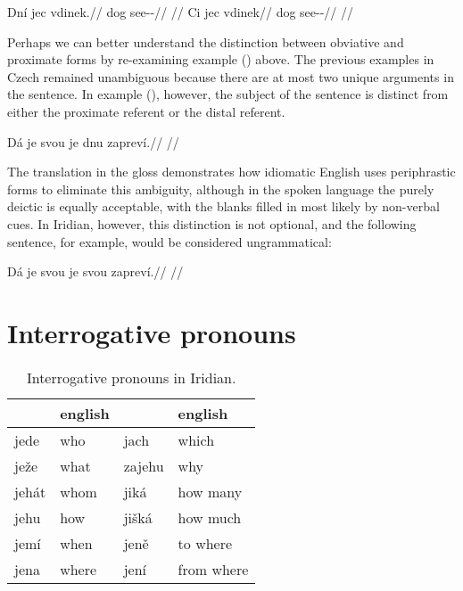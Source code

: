 \pex
\a
\begingl
\gla Dní jec vdinek.//
\glb {} dog see-\Pv{}-\Pf{}//
\glft {}//
\endgl
\a \begingl
\gla Ci jec vdinek//
\glb {} dog see-\Pv{}-\Pf{}//
\glft {}//
\endgl
\xe

Perhaps we can better understand the distinction between obviative and proximate forms by re-examining example () above. The previous examples in Czech remained unambiguous because there are at most two unique arguments in the sentence. In example (), however, the subject of the sentence is distinct from either the proximate referent or the distal referent.

\ex[exno={\getfullref{obv.obv1}}]
\begingl
\gla Dá je svou je dnu zapreví.//
\glft {}//
\endgl
\xe

The translation in the gloss demonstrates how idiomatic English uses periphrastic forms to eliminate this ambiguity, although in the spoken language the purely deictic  is equally acceptable, with the blanks filled in most likely by non-verbal cues. In Iridian, however, this distinction is not optional, and the following sentence, for example, would be considered ungrammatical:

\ex
\begingl
\gla *Dá je svou je svou zapreví.//
\glft {}//
\endgl
\xe

\section{Interrogative pronouns}\label{sec:int-pron}

\begin{table}[h!]
	\sffamily\footnotesize
	\caption{Interrogative pronouns in Iridian.}
    \medskip
	\begin{tabu} to 0.8
		\toprule
		&{\sc english}&&{\sc english}\\ 
		\midrule
		jede 		& who &jach &which\\ 
		ježe 	& what 		& zajehu 	&why\\ 
		jehát 	& whom		& jiká 	&how many\\ 
		jehu 		& how		&jišká&how much\\ 
		jemí 		& when 		& jeně 	&to where\\ 
		jena 		& where 	& jení 	&from where\\ 
		\bottomrule
	\end{tabu}
\end{table}

